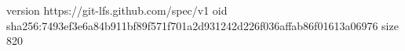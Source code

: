 version https://git-lfs.github.com/spec/v1
oid sha256:7493ef3e6a84b911bf89f571f701a2d931242d226f036affab86f01613a06976
size 820
